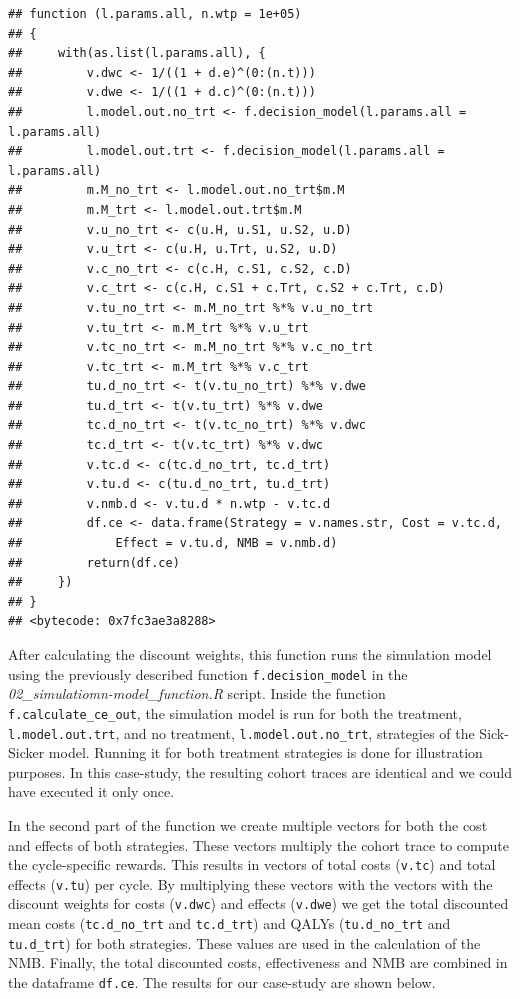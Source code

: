 \documentclass[]{article}
\begin{document}
\begin{verbatim}
## function (l.params.all, n.wtp = 1e+05) 
## {
##     with(as.list(l.params.all), {
##         v.dwc <- 1/((1 + d.e)^(0:(n.t)))
##         v.dwe <- 1/((1 + d.c)^(0:(n.t)))
##         l.model.out.no_trt <- f.decision_model(l.params.all = l.params.all)
##         l.model.out.trt <- f.decision_model(l.params.all = l.params.all)
##         m.M_no_trt <- l.model.out.no_trt$m.M
##         m.M_trt <- l.model.out.trt$m.M
##         v.u_no_trt <- c(u.H, u.S1, u.S2, u.D)
##         v.u_trt <- c(u.H, u.Trt, u.S2, u.D)
##         v.c_no_trt <- c(c.H, c.S1, c.S2, c.D)
##         v.c_trt <- c(c.H, c.S1 + c.Trt, c.S2 + c.Trt, c.D)
##         v.tu_no_trt <- m.M_no_trt %*% v.u_no_trt
##         v.tu_trt <- m.M_trt %*% v.u_trt
##         v.tc_no_trt <- m.M_no_trt %*% v.c_no_trt
##         v.tc_trt <- m.M_trt %*% v.c_trt
##         tu.d_no_trt <- t(v.tu_no_trt) %*% v.dwe
##         tu.d_trt <- t(v.tu_trt) %*% v.dwe
##         tc.d_no_trt <- t(v.tc_no_trt) %*% v.dwc
##         tc.d_trt <- t(v.tc_trt) %*% v.dwc
##         v.tc.d <- c(tc.d_no_trt, tc.d_trt)
##         v.tu.d <- c(tu.d_no_trt, tu.d_trt)
##         v.nmb.d <- v.tu.d * n.wtp - v.tc.d
##         df.ce <- data.frame(Strategy = v.names.str, Cost = v.tc.d, 
##             Effect = v.tu.d, NMB = v.nmb.d)
##         return(df.ce)
##     })
## }
## <bytecode: 0x7fc3ae3a8288>
\end{verbatim}

After calculating the discount weights, this function runs the
simulation model using the previously described function
\texttt{f.decision\_model} in the
\emph{02\_simulatiomn-model\_function.R} script. Inside the function
\texttt{f.calculate\_ce\_out}, the simulation model is run for both the
treatment, \texttt{l.model.out.trt}, and no treatment,
\texttt{l.model.out.no\_trt}, strategies of the Sick-Sicker model.
Running it for both treatment strategies is done for illustration
purposes. In this case-study, the resulting cohort traces are identical
and we could have executed it only once.

In the second part of the function we create multiple vectors for both
the cost and effects of both strategies. These vectors multiply the
cohort trace to compute the cycle-specific rewards. This results in
vectors of total costs (\texttt{v.tc}) and total effects (\texttt{v.tu})
per cycle. By multiplying these vectors with the vectors with the
discount weights for costs (\texttt{v.dwc}) and effects (\texttt{v.dwe})
we get the total discounted mean costs (\texttt{tc.d\_no\_trt} and
\texttt{tc.d\_trt}) and QALYs (\texttt{tu.d\_no\_trt} and
\texttt{tu.d\_trt}) for both strategies. These values are used in the
calculation of the NMB. Finally, the total discounted costs,
effectiveness and NMB are combined in the dataframe \texttt{df.ce}. The
results for our case-study are shown below.
\end{document}

